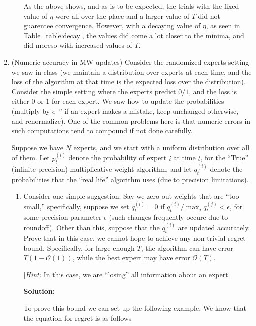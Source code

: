 \documentclass[12pt]{article}
\newcommand{\BigO}[1]{\mathcal{O}\left( #1 \right)}
\begin{document}
\begin{enumerate}
\begin{enumerate}
As the above shows, and as is to be expected, the trials with the fixed value of $\eta$ were all over the place and a larger value of $T$ did not guarentee convergence. However, with a decaying value of $\eta$, as seen in Table~\ref{table:decay}, the values did come a lot closer to the minima, and did moreso with increased values of $T$.





\end{enumerate}

\item (Numeric accuracy in MW updates) Consider the randomized experts setting we saw in class (we maintain a distribution over experts at each time, and the loss of the algorithm at that time is the expected loss over the distribution). Consider the simple setting where the experts predict $0/1$, and the loss is either $0$ or $1$ for each expert. We saw how to update the probabilities (multiply by $e^{-\eta}$ if an expert makes a mistake, keep unchanged otherwise, and renormalize). One of the common problems here is that numeric errors in such computations tend to compound if not done carefully.

Suppose we have $N$ experts, and we start with a uniform distribution over all of them. Let $p_{t}^{(i)}$ denote the probability of expert $i$ at time $t$, for the ``True'' (infinite precision) multiplicative weight algorithm, and let $q_{t}^{(i)}$ denote the probabilities that the ``real life'' algorithm uses (due to precision limitations).

\begin{enumerate}
  \item Consider one simple suggestion: Say we zero out weights that are ``too small,'' specifically, suppose we set $q_{t}^{(i)} = 0$ if $q_{t}^{(i)}/\max_{j}q_{t}^{(j)} < \epsilon$, for some precision parameter $\epsilon$ (such changes frequently occure due to roundoff). Other than this, suppose that the $q_{t}^{(i)}$ are updated accurately. Prove that in this case, we cannot hope to achieve any non-trivial regret bound. Specifically, for large enough $T$, the algorithm can have error $T(1 - \BigO{1})$, while the best expert may have error $\BigO{T}$.

[{\em Hint:} In this case, we are ``losing'' all information about an expert]

      {\bf Solution:}

To prove this bound we can set up the following example. We know that the equation for regret is as follows


\end{enumerate}
\end{enumerate}
\end{document}
